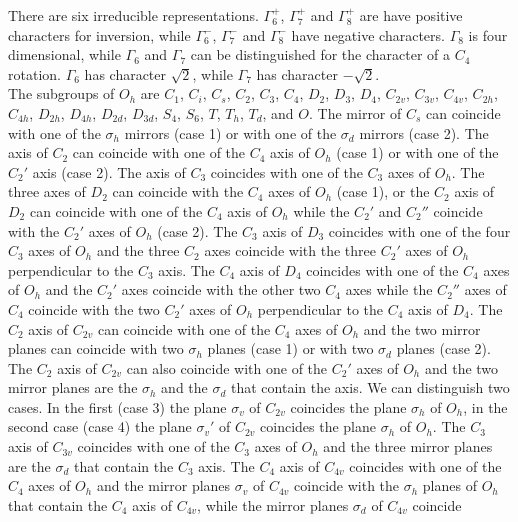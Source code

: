 \documentclass[12pt,a4paper,twoside]{report}
\begin{document}
There are six irreducible representations. $\Gamma_6^+$, $\Gamma_7^+$ and
$\Gamma_8^+$ are have positive characters for inversion, while
$\Gamma_6^-$, $\Gamma_7^-$ and $\Gamma_8^-$ have negative characters.
$\Gamma_8$ is four dimensional, while $\Gamma_6$ and $\Gamma_7$ can be
distinguished for the character of a $C_4$ rotation. $\Gamma_6$ has 
character $\sqrt{2}$, while $\Gamma_7$ has character $-\sqrt{2}.$ \\
The subgroups of $O_h$ are $C_1$, $C_i$, $C_s$, $C_2$, $C_3$, $C_4$,
$D_2$, $D_3$, $D_4$, $C_{2v}$, $C_{3v}$, $C_{4v}$, $C_{2h}$, $C_{4h}$, 
$D_{2h}$, $D_{4h}$, $D_{2d}$, $D_{3d}$, $S_4$, $S_6$, $T$, $T_h$, 
$T_d$, and $O$. The mirror of $C_s$ can coincide with one of the $\sigma_h$ 
mirrors (case 1) or with one of the $\sigma_d$ mirrors (case 2). The axis
of $C_2$ can coincide with one of the $C_4$ axis of $O_h$ (case 1) or
with one of the $C_2'$ axis (case 2). The axis of $C_3$ coincides with one
of the $C_3$ axes of $O_h$. The three axes of $D_2$ can coincide with the
$C_4$ axes of $O_h$ (case 1), or the $C_2$ axis of $D_2$ can coincide with one
of the $C_4$ axis of $O_h$ while the $C_2'$ and $C_2''$ coincide 
with the $C_2'$ axes of $O_h$ (case 2). The $C_3$ axis of $D_3$ coincides with
one of the four $C_3$ axes of $O_h$ and the three $C_2$ axes coincide with
the three $C_2'$ axes of $O_h$ perpendicular to the $C_3$ axis. The $C_4$
axis of $D_4$ coincides with one of the $C_4$ axes of $O_h$ and the
$C_2'$ axes coincide with the other two $C_4$ axes while the $C_2''$ axes
of $C_4$ coincide with the two $C_2'$ axes of $O_h$ perpendicular to the
$C_4$ axis of $D_4$. The $C_2$ axis of $C_{2v}$ can coincide with one of
the $C_4$ axes of $O_h$ and the two mirror planes can coincide with two
$\sigma_h$ planes (case 1) or with two $\sigma_d$ planes (case 2). The
$C_2$ axis of $C_{2v}$ can also coincide with one of the $C_2'$ axes
of $O_h$ and the two mirror planes are the $\sigma_h$ and the $\sigma_d$ 
that contain the axis. We can distinguish two cases. In the first (case 3)
the plane $\sigma_v$ of $C_{2v}$ coincides the plane $\sigma_h$ of $O_h$, 
in the second case (case 4) the plane $\sigma_v'$ of $C_{2v}$ coincides 
the plane $\sigma_h$ of $O_h$.
The $C_3$ axis of $C_{3v}$ coincides with one of the $C_3$ axes of $O_h$ and
the three mirror planes are the $\sigma_d$ that contain the $C_3$ axis.
The $C_4$ axis of $C_{4v}$ coincides with one of the $C_4$ axes of $O_h$
and the mirror planes $\sigma_v$ of $C_{4v}$ coincide with the $\sigma_h$
planes of $O_h$ that contain the $C_4$ axis of $C_{4v}$, 
while the mirror planes $\sigma_d$ of $C_{4v}$ coincide
\end{document}
